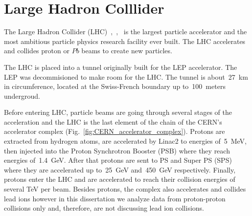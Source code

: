 \section{Large Hadron Colllider}
\label{sec:Exp_LHC}

The Large Hadron Collider (LHC)~\cite{ref_LHC_brochure},~\cite{ref_LHC_TDR},~\cite{ref_LHC_website} is the largest particle accelerator and the most ambitious particle physics research facility ever built. The LHC accelerates and collides proton or $Pb$ beams to create new particles. 

The LHC is placed into a tunnel originally built for the LEP accelerator. The LEP was decommisioned to make room for the LHC. The tunnel is about~27~km in circumference, located at the Swiss-French boundary up to~100~meters undergroud.

Before entering LHC, particle beams are going through several stages of the acceleration and the LHC is the last element of the chain of the CERN's accelerator complex (Fig.~\ref{fig:CERN_accelerator_complex}). Protons are extracted from hydrogen atoms, are accelerated by Linac2 to energies of~5~MeV, then injected into the Proton Synchrotron Booster (PSB) where they reach energies of~1.4~GeV. After that protons are sent to PS and Super PS (SPS) where they are accelerated up to~25~GeV and~450~GeV respectively. Finally, protons enter the LHC and are accelerated to reach their collision energies of several TeV per beam. Besides protons, the complex also accelerates and collides lead ions however in this dissertation we analyze data from proton-proton collisions only and, therefore, are not discussing lead ion collisions.    


